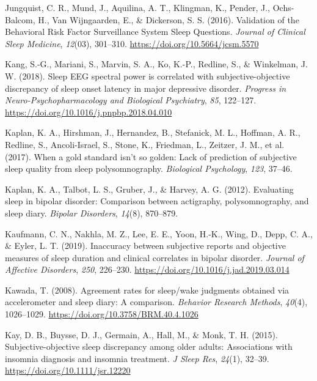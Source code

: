\documentclass[
]{article}
\newlength{\cslhangindent}
\newenvironment{CSLReferences}[2] %
 {\begin{list}{}{%
  \setlength{\itemindent}{0pt}
  \setlength{\leftmargin}{0pt}
  \setlength{\parsep}{0pt}
  \ifodd #1
   \setlength{\leftmargin}{\cslhangindent}
   \setlength{\itemindent}{-1\cslhangindent}
  \fi
  \setlength{\itemsep}{#2\baselineskip}}}
 {\end{list}}
\begin{document}
\begin{CSLReferences}{1}{0}
Jungquist, C. R., Mund, J., Aquilina, A. T., Klingman, K., Pender, J., Ochs-Balcom, H., Van Wijngaarden, E., \& Dickerson, S. S. (2016). Validation of the {Behavioral} {Risk} {Factor} {Surveillance} {System} {Sleep} {Questions}. \emph{Journal of Clinical Sleep Medicine}, \emph{12}(03), 301--310. \url{https://doi.org/10.5664/jcsm.5570}

Kang, S.-G., Mariani, S., Marvin, S. A., Ko, K.-P., Redline, S., \& Winkelman, J. W. (2018). Sleep {EEG} spectral power is correlated with subjective-objective discrepancy of sleep onset latency in major depressive disorder. \emph{Progress in Neuro-Psychopharmacology and Biological Psychiatry}, \emph{85}, 122--127. \url{https://doi.org/10.1016/j.pnpbp.2018.04.010}

Kaplan, K. A., Hirshman, J., Hernandez, B., Stefanick, M. L., Hoffman, A. R., Redline, S., Ancoli-Israel, S., Stone, K., Friedman, L., Zeitzer, J. M., et al. (2017). When a gold standard isn't so golden: Lack of prediction of subjective sleep quality from sleep polysomnography. \emph{Biological Psychology}, \emph{123}, 37--46.

Kaplan, K. A., Talbot, L. S., Gruber, J., \& Harvey, A. G. (2012). Evaluating sleep in bipolar disorder: Comparison between actigraphy, polysomnography, and sleep diary. \emph{Bipolar Disorders}, \emph{14}(8), 870--879.

Kaufmann, C. N., Nakhla, M. Z., Lee, E. E., Yoon, H.-K., Wing, D., Depp, C. A., \& Eyler, L. T. (2019). Inaccuracy between subjective reports and objective measures of sleep duration and clinical correlates in bipolar disorder. \emph{Journal of Affective Disorders}, \emph{250}, 226--230. \url{https://doi.org/10.1016/j.jad.2019.03.014}

Kawada, T. (2008). Agreement rates for sleep/wake judgments obtained via accelerometer and sleep diary: {A} comparison. \emph{Behavior Research Methods}, \emph{40}(4), 1026--1029. \url{https://doi.org/10.3758/BRM.40.4.1026}

Kay, D. B., Buysse, D. J., Germain, A., Hall, M., \& Monk, T. H. (2015). Subjective-objective sleep discrepancy among older adults: Associations with insomnia diagnosis and insomnia treatment. \emph{J Sleep Res}, \emph{24}(1), 32--39. \url{https://doi.org/10.1111/jsr.12220}


\end{CSLReferences}
\end{document}
